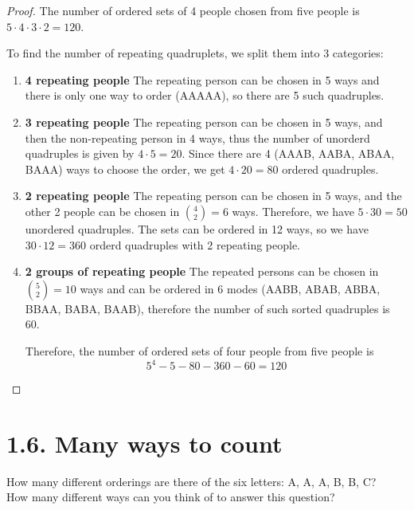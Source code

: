 \begin{proof}
    The number of ordered sets of 4 people chosen from five people is $5 \cdot 4 \cdot 3 \cdot 2 = 120$.

    To find the number of repeating quadruplets, we split them into 3 categories:
    \begin{enumerate}
        \item \textbf{4 repeating people} The repeating person can be chosen in 5 ways and there is only one way
            to order (AAAAA), so there are 5 such quadruples.

        \item \textbf{3 repeating people} The repeating person can be chosen in 5 ways, and then the 
            non-repeating person in 4 ways, thus the number of unorderd quadruples is given 
            by $4 \cdot 5 = 20$. Since there are 4 (AAAB, AABA, ABAA, BAAA) ways to choose the 
            order, we get $4 \cdot 20 = 80$ ordered quadruples.

        \item \textbf{2 repeating people} The repeating person can be chosen in 5 ways, and the other 2 people
            can be chosen in $\binom{4}{2} = 6$ ways. Therefore, we have $5 \cdot 30 = 50$ unordered quadruples.
            The sets can be ordered in 12 ways, so we have $30 \cdot 12 = 360$ orderd quadruples with 2 
            repeating people.

        \item \textbf{2 groups of repeating people} The repeated persons can be chosen in $\binom{5}{2} = 10$ 
            ways and can be ordered in 6 modes (AABB, ABAB, ABBA, BBAA, BABA, BAAB), therefore the number
            of such sorted quadruples is 60.

            Therefore, the number of ordered sets of four people from five people is 
            \[
                5^4 - 5 - 80 - 360 - 60 = 120
            \] 
    \end{enumerate}
\end{proof}

\vspace{1em}

\section*{1.6. Many ways to count}
How many different orderings are there of the six letters: A, A, A, B, B, C? \\
How many different ways can you think of to answer this question?

